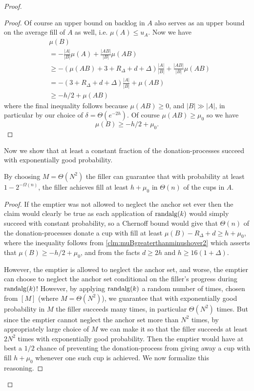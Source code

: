 \begin{proof}
\begin{proof}
  Of course an upper bound on backlog in $A$ also serves as
  an upper bound on the average fill of $A$ as well, i.e.
  $\mu(A) \le u_A$.  Now we have
  \begin{align*}
    &\mu(B) \\
           &= -\frac{|A|}{|B|} \mu(A) + \frac{|A B|}{|B|}\mu(A B) \\
           &\ge -(\mu(AB) + 3+R_\Delta+d+\Delta) \frac{|A|}{|B|} + \frac{|AB|}{|B|}\mu(AB)\\
           &= -(3+R_\Delta+d + \Delta) \frac{|A|}{|B|} + \mu(AB)\\
           &\ge -h/2 + \mu(AB)
  \end{align*}
  where the final inequality follows because $\mu(AB) \ge 0$, and
  $|B|\gg |A|$, in particular by our choice of $\delta = \Theta(e^{-2h})$.
  Of course $\mu(AB) \ge \mu_0$ so we have
  $$\mu(B) \ge -h/2 + \mu_0.$$

\end{proof}

Now we show that at least a constant fraction of the
donation-processes succeed with exponentially good probability.
\begin{clm}
  \label{clm:baseChernoffBound}
  By choosing $M =\Theta(N^2)$ the filler can guarantee that with
  probability at least $1-2^{-\Omega(n)}$, the filler achieves
  fill at least $h+\mu_0$ in $\Theta(n)$ of the cups in $A$. 
\end{clm}
\begin{proof}
  If the emptier was not allowed to neglect the anchor set ever
  then the claim would clearly be true as each application of
  $\operatorname{\text{\textup{randalg}}}(k)$ would simply succeed with constant
  probability, so a Chernoff bound would give that $\Theta(n)$ of
  the donation-processes donate a cup with fill at least $\mu(B)
  - R_\Delta + d \ge h + \mu_0$, where the inequality follows
  from \cref{clm:muBgreaterthanminushover2} which asserts that
  $\mu(B) \ge -h/2 + \mu_0$, and from the facts $d\ge 2h$ and $h
  \ge 16(1+\Delta)$. 

  However, the emptier is allowed to neglect
  the anchor set, and worse, the emptier can choose to neglect
  the anchor set conditional on the filler's progress during
  $\operatorname{\text{\textup{randalg}}}(k)$! However, by applying $\operatorname{\text{\textup{randalg}}}(k)$ a random
  number of times, chosen from $[M]$ (where $M=\Theta(N^2)$), we
  guarantee that with exponentially good
  probability in $M$ the filler succeeds many times, in particular
  $\Theta(N^2)$ times. But since the emptier cannot neglect the
  anchor set more than $N^2$ times, by appropriately large choice
  of $M$ we can make it so that the filler succeeds at least $2N^2$
  times with exponentially good probability. Then the emptier
  would have at best a $1/2$ chance of preventing the
  donation-process from giving away a cup with fill $h+\mu_0$
  whenever one such cup is achieved. We now formalize this
  reasoning.


\end{proof}
\end{proof}
